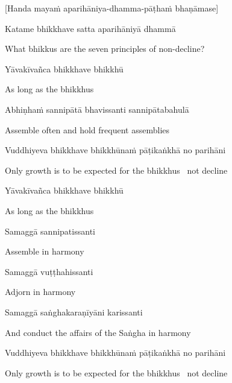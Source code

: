 \begin{center}
  [Handa mayaṁ aparihāniya-dhamma-pāṭhaṁ bhaṇāmase]
\end{center}

Katame bhikkhave satta aparihāniyā dhammā

\begin{cprenglish}
  What bhikkus are the seven principles of non-decline?
\end{cprenglish}

Yāvakīvañca bhikkhave bhikkhū

\begin{cprenglish}
  As long as the bhikkhus
\end{cprenglish}

Abhiṇhaṁ sannipātā bhavissanti sannipātabahulā

\begin{cprenglish}
  Assemble often and hold frequent assemblies
\end{cprenglish}

Vuddhiyeva bhikkhave bhikkhūnaṁ pāṭikaṅkhā no parihāni

\begin{cprenglish}
  Only growth is to be expected for the bhikkhus \breathmark\ not decline
\end{cprenglish}

Yāvakīvañca bhikkhave bhikkhū

\begin{cprenglish}
  As long as the bhikkhus
\end{cprenglish}

Samaggā sannipatissanti

\begin{cprenglish}
  Assemble in harmony
\end{cprenglish}

Samaggā vuṭṭhahissanti

\begin{cprenglish}
  Adjorn in harmony
\end{cprenglish}

Samaggā saṅghakaraṇīyāni karissanti

\begin{cprenglish}
  And conduct the affairs of the Saṅgha in harmony
\end{cprenglish}

Vuddhiyeva bhikkhave bhikkhūnaṁ pāṭikaṅkhā no parihāni

\begin{cprenglish}
  Only growth is to be expected for the bhikkhus \breathmark\ not decline
\end{cprenglish}

